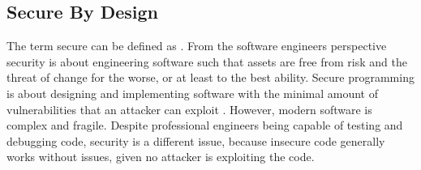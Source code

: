 \subsection{Secure By Design}
The term secure can be defined as . From the software engineers perspective security is about engineering software such that assets are free from risk and the threat of change for the worse, or at least to the best ability. Secure programming is about designing and implementing software with the minimal amount of vulnerabilities that an attacker can exploit \cite{helfrich2019security}. However, modern software is complex and fragile. Despite professional engineers being capable of testing and debugging code, security is a different issue, because insecure code generally works without issues, given no attacker is exploiting the code.

